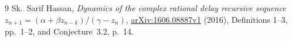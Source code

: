 \documentclass[11pt]{article}
\begin{document}
\begin{thebibliography}{9}
 Sk.~Sarif Hassan,
\emph{Dynamics of the complex rational delay recursive sequence
$z_{n+1}=(\alpha+\beta z_{n-k})/(\gamma-z_n)$},
\href{https://arxiv.org/abs/1606.08887v1}{arXiv:1606.08887v1} (2016),
Definitions 1--3, pp.~1--2, and Conjecture~3.2, p.~14.
\end{thebibliography}
\end{document}
